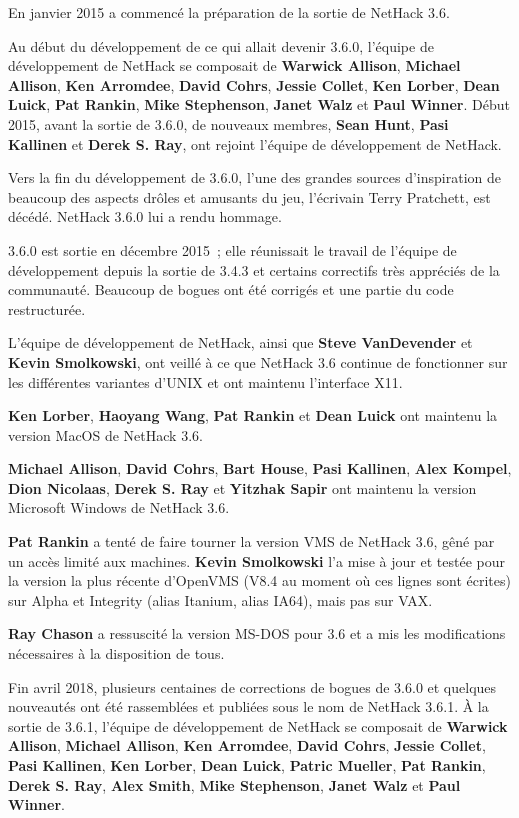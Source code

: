 \documentclass[titlepage]{article}
\begin{document}
En janvier 2015 a commencé la préparation de la sortie de NetHack 3.6.


Au début du développement de ce qui allait devenir 3.6.0, l'équipe de
développement de NetHack se composait de \textbf{Warwick Allison},
\textbf{Michael Allison}, \textbf{Ken Arromdee},
\textbf{David Cohrs}, \textbf{Jessie Collet},
\textbf{Ken Lorber}, \textbf{Dean Luick}, \textbf{Pat Rankin},
\textbf{Mike Stephenson}, \textbf{Janet Walz} et \textbf{Paul Winner}.
Début 2015, avant la sortie de 3.6.0, de nouveaux membres,
\textbf{Sean Hunt}, \textbf{Pasi Kallinen} et \textbf{Derek S. Ray},
ont rejoint l'équipe de développement de NetHack.


Vers la fin du développement de 3.6.0, l'une des grandes sources
d'inspiration de beaucoup des aspects drôles et amusants du jeu,
l'écrivain Terry Pratchett, est décédé.
NetHack 3.6.0 lui a rendu hommage.


3.6.0 est sortie en décembre 2015~; elle réunissait le travail de l'équipe
de développement depuis la sortie de 3.4.3 et certains correctifs très
appréciés de la communauté.
Beaucoup de bogues ont été corrigés et une partie du code restructurée.


L'équipe de développement de NetHack, ainsi que \textbf{Steve VanDevender} et
\textbf{Kevin Smolkowski}, ont veillé à ce que NetHack 3.6 continue de
fonctionner sur les différentes variantes
d'UNIX
et ont maintenu l'interface X11.


\textbf{Ken Lorber}, \textbf{Haoyang Wang}, \textbf{Pat Rankin} et \textbf{Dean Luick}
ont maintenu la version MacOS de NetHack 3.6.


\textbf{Michael Allison}, \textbf{David Cohrs}, \textbf{Bart House},
\textbf{Pasi Kallinen}, \textbf{Alex Kompel}, \textbf{Dion Nicolaas},
\textbf{Derek S. Ray} et \textbf{Yitzhak Sapir} ont maintenu la version
Microsoft Windows de NetHack 3.6.


\textbf{Pat Rankin} a tenté de faire tourner la version VMS de NetHack 3.6,
gêné par un accès limité aux machines.
\textbf{Kevin Smolkowski} l'a mise à jour et testée pour la version la plus
récente d'OpenVMS (V8.4 au moment où ces lignes sont écrites) sur Alpha et
Integrity (alias Itanium, alias IA64), mais pas sur VAX.


\textbf{Ray Chason} a ressuscité la version MS-DOS pour 3.6 et a mis les
modifications nécessaires à la disposition de tous.


Fin avril 2018, plusieurs centaines de corrections de bogues de 3.6.0 et
quelques nouveautés ont été rassemblées et publiées sous le nom de
NetHack 3.6.1.
À la sortie de 3.6.1, l'équipe de développement de NetHack se composait de
\textbf{Warwick Allison}, \textbf{Michael Allison}, \textbf{Ken Arromdee},
\textbf{David Cohrs}, \textbf{Jessie Collet}, \textbf{Pasi Kallinen},
\textbf{Ken Lorber}, \textbf{Dean Luick}, \textbf{Patric Mueller},
\textbf{Pat Rankin}, \textbf{Derek S. Ray}, \textbf{Alex Smith},
\textbf{Mike Stephenson}, \textbf{Janet Walz} et \textbf{Paul Winner}.
\end{document}
